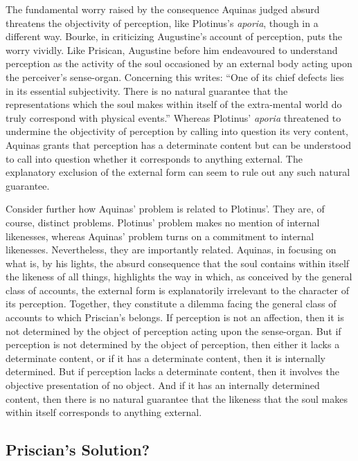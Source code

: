 \documentclass[12pt]{article}
\begin{document}
The fundamental worry raised by the consequence Aquinas judged absurd threatens the objectivity of perception, like Plotinus's \emph{aporia}, though in a different way. Bourke, in criticizing Augustine's account of perception, puts the worry vividly. Like Prisican, Augustine before him endeavoured to understand perception as the activity of the soul occasioned by an external body acting upon the perceiver's sense-organ. Concerning this \citet[112]{Bourke:1947jk} writes: ``One of its chief defects lies in its essential subjectivity. There is no natural guarantee that the representations which the soul makes within itself of the extra-mental world do truly correspond with physical events.'' Whereas Plotinus' \emph{aporia} threatened to undermine the objectivity of perception by calling into question its very content, Aquinas grants that perception has a determinate content but can be understood to call into question whether it corresponds to anything external. The explanatory exclusion of the external form can seem to rule out any such natural guarantee.

Consider further how Aquinas' problem is related to Plotinus'. They are, of course, distinct problems. Plotinus' problem makes no mention of internal likenesses, whereas Aquinas' problem turns on a commitment to internal likenesses. Nevertheless, they are importantly related. Aquinas, in focusing on what is, by his lights, the absurd consequence that the soul contains within itself the likeness of all things, highlights the way in which, as conceived by the general class of accounts, the external form is explanatorily irrelevant to the character of its perception. Together, they constitute a dilemma facing the general class of accounts to which Priscian's belongs. If perception is not an affection, then it is not determined by the object of perception acting upon the sense-organ. But if perception is not determined by the object of perception, then either it lacks a determinate content, or if it has a determinate content, then it is internally determined. But if perception lacks a determinate content, then it involves the objective presentation of no object. And if it has an internally determined content, then there is no natural guarantee that the likeness that the soul makes within itself corresponds to anything external.



\subsection{Priscian's Solution?} %
\label{sec:_ldots_and_priscian_s_solution}
\end{document}
